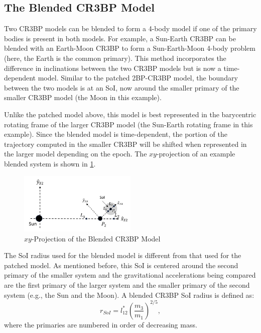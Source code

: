 \subsection{The Blended CR3BP Model}
Two CR3BP models can be blended to form a 4-body model if one of the primary bodies is present in
both models. For example, a Sun-Earth CR3BP can be blended with an Earth-Moon CR3BP to form a
Sun-Earth-Moon 4-body problem (here, the Earth is the common primary). This method incorporates the
difference in inclinations between the two CR3BP models but is now a time-dependent
model\cite{Kakoi:2014}. Similar to the patched 2BP-CR3BP model, the boundary between the two models
is at an SoI, now around the smaller primary of the smaller CR3BP model (the Moon in this example).

Unlike the patched model above, this model is best represented in the barycentric rotating frame of
the larger CR3BP model (the Sun-Earth rotating frame in this example). Since the blended model is
time-dependent, the portion of the trajectory computed in the smaller CR3BP will be shifted when
represented in the larger model depending on the epoch. The $xy$-projection of an example blended
system is shown in \cref{fig:BlendedCR3BP}.

\begin{figure}[ht]
    \centering
    \includegraphics[width=0.5\textwidth]{figures/BlendCR3BP.jpg}
    \caption{$xy$-Projection of the Blended CR3BP Model}
    \label{fig:BlendedCR3BP}
\end{figure}

The SoI radius used for the blended model is different from that used for the patched model. As
mentioned before, this SoI is centered around the second primary of the smaller system and the
gravitational accelerations being compared are the first primary of the larger system and the
smaller primary of the second system (e.g., the Sun and the Moon). A blended CR3BP SoI radius is
defined as:
\begin{equation}
    r_{SoI}=l^{*}_{12}(\frac{m_{3}}{m_{1}})^{2/5},
    \label{eq:blendedSoI}
\end{equation}
where the primaries are numbered in order of decreasing mass\cite{Parker:2013}.
